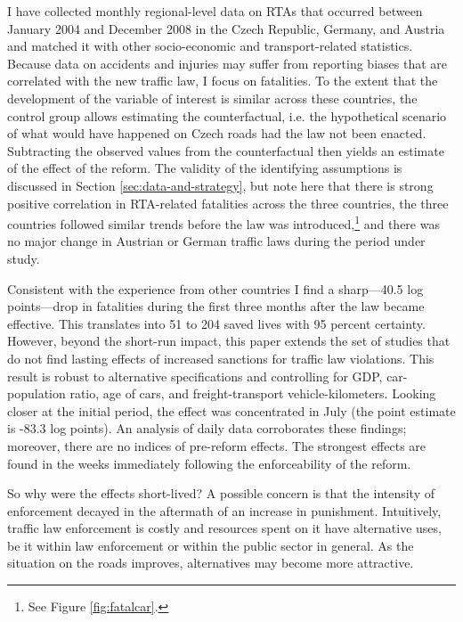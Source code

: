 \documentclass[12pt]{article}
\begin{document}
I have collected monthly regional-level data on RTAs that occurred between
January 2004 and December 2008 in the Czech Republic, Germany, and Austria and
matched it with other socio-economic and transport-related statistics. Because
data on accidents and injuries may suffer from reporting biases that are
correlated with the new traffic law, I focus on fatalities. To the extent that
the development of the variable of interest is similar across these countries,
the control group allows estimating the counterfactual, i.e. the hypothetical
scenario of what would have happened on Czech roads had the law not been
enacted. Subtracting the observed values from the counterfactual then yields an
estimate of the effect of the reform. The validity of the identifying
assumptions is discussed in Section \ref{sec:data-and-strategy}, but note here
that there is strong positive correlation in RTA-related fatalities across the
three countries, the three countries followed similar trends before the law was
introduced,\footnote{See Figure \vref{fig:fatalcar}.} and there was no major
change in Austrian or German traffic laws during the period under study.

Consistent with the experience from other countries I find a sharp---40.5 log
points---drop in fatalities during the first three months after the law became
effective. This translates into 51 to 204 saved lives with 95 percent certainty.
However, beyond the short-run impact, this paper extends the set of studies that
do not find lasting effects of increased sanctions for traffic law violations.
This result is robust to alternative specifications and controlling for GDP,
car-population ratio, age of cars, and freight-transport vehicle-kilometers.
Looking closer at the initial period, the effect was concentrated in July (the
point estimate is -83.3 log points). An analysis of daily data corroborates
these findings; moreover, there are no indices of pre-reform effects. The
strongest effects are found in the weeks immediately following the
enforceability of the reform.

So why were the effects short-lived? A possible concern is that the intensity
of enforcement decayed in the aftermath of an increase in punishment.
Intuitively, traffic law enforcement is costly and resources spent on it have
alternative uses, be it within law enforcement or within the public sector
in general. As the situation on the roads improves, alternatives may become more
attractive.
  
\end{document}
